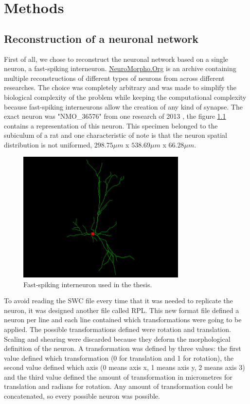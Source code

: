 \chapter{Methods}
\label{chapter:methods}

\section{Reconstruction of a neuronal network}
\label{reconstruction}
First of all, we chose to reconstruct the neuronal network based on a single neuron, a fast-spiking interneuron. \href{https://neuromorpho.org/}{NeuroMorpho.Org} \cite{Neuromorpho1,Neuromorpho2} is an archive containing multiple reconstructions of different types of neurons from across different researches. The choice was completely arbitrary and was made to simplify the biological complexity of the problem while keeping the computational complexity because fast-spiking interneurons allow the creation of any kind of synapse. The exact neuron was "NMO\_36576" from one research of 2013 \cite{interneuron}, the figure \ref{fig:interneuron} contains a representation of this neuron. This specimen belonged to the subiculum of a rat and one characteristic of note is that the neuron spatial distribution is not uniformed, $298.75 \mu m$ x $538.69 \mu m$ x $66.28 \mu m$.
\begin{figure}[h!]
    \centering
    \includegraphics[width=0.75\textwidth]{setup/img/interneuron.png}
    \caption{Fast-spiking interneuron used in the thesis.}
    \label{fig:interneuron}
\end{figure}

To avoid reading the SWC file every time that it was needed to replicate the neuron, it was designed another file called RPL. This new format file defined a neuron per line and each line contained which transformations were going to be applied. The possible transformations defined were rotation and translation. Scaling and shearing were discarded because they deform the morphological definition of the neuron. A transformation was defined by three values: the first value defined which transformation (0 for translation and 1 for rotation), the second value defined which axis (0 means axis x, 1 means axis y, 2 means axis 3) and the third value defined the amount of transformation in micrometres for translation and radians for rotation. Any amount of transformation could be concatenated, so every possible neuron was possible.

